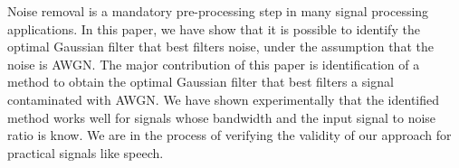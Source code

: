 \documentclass[journal,onecolumn]{IEEEtran}
\begin{document}
Noise removal is a mandatory pre-processing step in many signal processing
applications. In this paper, we have show that it is possible to identify the
optimal Gaussian filter that best filters noise, under the assumption that the
noise is AWGN. The major contribution of this paper is identification of a
method to obtain the optimal Gaussian filter that best filters a
signal contaminated with AWGN. We have shown experimentally that the identified
method works well for signals whose bandwidth and the input signal to noise ratio 
is know. 
We are in the process of verifying the validity of our approach for 
practical signals like speech.





\end{document}
